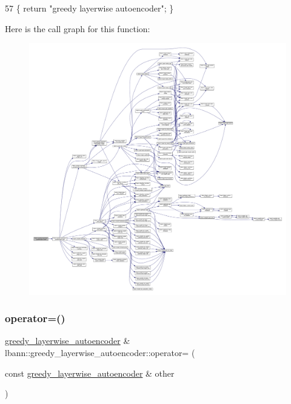 \begin{DoxyCode}
57 \{ \textcolor{keywordflow}{return} \textcolor{stringliteral}{"greedy layerwise autoencoder"}; \}
\end{DoxyCode}
Here is the call graph for this function\+:\nopagebreak
\begin{figure}[H]
\begin{center}
\leavevmode
\includegraphics[width=350pt]{classlbann_1_1greedy__layerwise__autoencoder_a975ea739b9a97e76fac46ce8191dea84_cgraph}
\end{center}
\end{figure}
\mbox{\label{classlbann_1_1greedy__layerwise__autoencoder_ac5e2de693353966b7816ca10282068f5}} 
\subsubsection{\texorpdfstring{operator=()}{operator=()}}
{\footnotesize\ttfamily \hyperlink{classlbann_1_1greedy__layerwise__autoencoder}{greedy\+\_\+layerwise\+\_\+autoencoder} \& lbann\+::greedy\+\_\+layerwise\+\_\+autoencoder\+::operator= (\begin{DoxyParamCaption}\item[{const \hyperlink{classlbann_1_1greedy__layerwise__autoencoder}{greedy\+\_\+layerwise\+\_\+autoencoder} \&}]{other }\end{DoxyParamCaption})}


